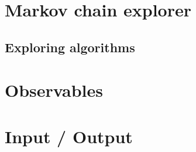 \documentclass[a4paper, 12pt]{article}
\def\buildMode{buildmissing}
\begin{document}
    \section{Markov chain explorer}

        \subsection{Exploring algorithms}
        \begin{figure}[htb]
            \centering
            
            \caption{}
        \end{figure}
        \clearpage

    \section{Observables}
        \begin{figure}[htb]
            \centering
            
            \caption{}
        \end{figure}
        \clearpage

    \section{Input / Output}

        \begin{figure}[htb]
            \centering
            
            \caption{}
        \end{figure}

        \begin{figure}[htb]
            \centering
            
            \caption{}
        \end{figure}
        \clearpage

    \nocite{*}
    \printbibliography
\end{document}
